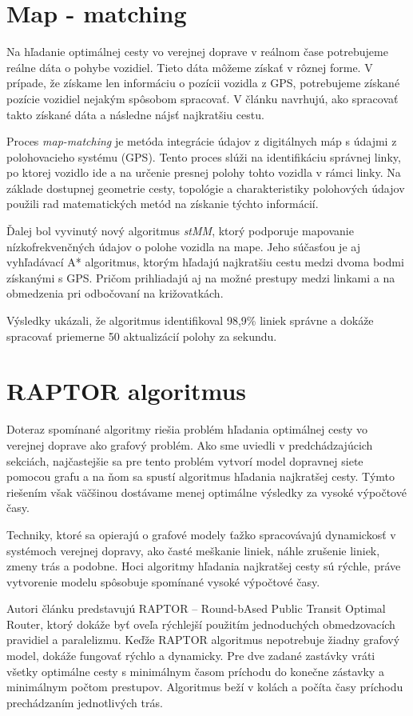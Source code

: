\section{Map - matching}
Na hľadanie optimálnej cesty vo verejnej doprave v reálnom čase potrebujeme reálne dáta o pohybe vozidiel. Tieto dáta môžeme získať v rôznej forme. V prípade, že získame len informáciu o pozícii vozidla z GPS, potrebujeme získané pozície vozidiel nejakým spôsobom spracovať. V článku \cite{mapmatching} navrhujú, ako spracovať takto získané dáta a následne nájsť najkratšiu cestu.

Proces \textit{map-matching} je metóda integrácie údajov z digitálnych máp s údajmi z polohovacieho systému (GPS). Tento proces slúži na identifikáciu správnej linky, po ktorej vozidlo ide a na určenie presnej polohy tohto vozidla v rámci linky. Na základe dostupnej geometrie cesty, topológie a charakteristiky polohových údajov použili rad matematických metód na získanie týchto informácií. 

Ďalej bol vyvinutý nový algoritmus \textit{stMM}, ktorý podporuje mapovanie nízkofrekvenčných údajov o polohe vozidla na mape. Jeho súčasťou je aj vyhľadávací A* algoritmus, ktorým hľadajú najkratšiu cestu medzi dvoma bodmi získanými s GPS. Pričom prihliadajú aj na možné prestupy medzi linkami a na obmedzenia pri odbočovaní na križovatkách.

Výsledky ukázali, že algoritmus identifikoval 98,9\% liniek správne a dokáže spracovať priemerne 50 aktualizácií polohy za sekundu.  
 

\section{RAPTOR algoritmus}
Doteraz spomínané algoritmy riešia problém hľadania optimálnej cesty vo verejnej doprave ako grafový problém. Ako sme uviedli v predchádzajúcich sekciách, najčastejšie sa pre tento problém vytvorí model dopravnej siete pomocou grafu a na ňom sa spustí algoritmus hľadania najkratšej cesty. Týmto riešením však väčšinou dostávame menej optimálne výsledky za vysoké výpočtové časy.

Techniky, ktoré sa opierajú o grafové modely ťažko spracovávajú dynamickosť v systémoch verejnej dopravy, ako časté meškanie liniek, náhle zrušenie liniek, zmeny trás a podobne. Hoci algoritmy hľadania najkratšej cesty sú rýchle, práve vytvorenie modelu spôsobuje spomínané vysoké výpočtové časy.

Autori článku \cite{raptor} predstavujú RAPTOR – Round-bAsed Public Transit Optimal Router, ktorý dokáže byť oveľa rýchlejší použitím jednoduchých obmedzovacích pravidiel a paralelizmu. Keďže RAPTOR algoritmus nepotrebuje žiadny grafový model, dokáže fungovať rýchlo a dynamicky. Pre dve zadané zastávky vráti všetky optimálne cesty s minimálnym časom príchodu do konečne zástavky a minimálnym počtom prestupov. Algoritmus beží v kolách a počíta časy príchodu prechádzaním jednotlivých trás.

